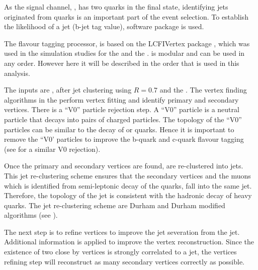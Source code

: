 As the signal channel, \eeToHHbbWWHad,  has two \Pbottom quarks in the final state, identifying jets originated from \Pbottom quarks is an important part of the event selection. To establish the likelihood of a \Pbottom jet (b-jet tag value), \lcfiplus \cite{Suehara:2015ura} software package is used.


The flavour tagging processor, \lcfiplus \cite{Suehara:2015ura} is based on the LCFIVertex package \cite{Bailey:2009ui}, which was used in the simulation studies for the \ILCloi \cite{Abe:2010aa,Aihara:2009ad} and the \CLICcdr \cite{Linssen:2012hp}.  \lcfiplus is modular and can be used in any order. However here it will be described in the order that is used in this analysis.


The inputs are \PFOs, after jet clustering using $R = 0.7$ and the \normalPFO. The vertex finding algorithms in the \lcfiplus perform vertex fitting and identify primary and secondary vertices. There is a ``V0'' particle rejection step.  A ``V0'' particle is a  neutral particle that decays into pairs of charged particles. The topology of the ``V0'' particles can be  similar to the decay of \Pbottom or \Pcharm quarks. Hence it is important to remove the ``V0' particles to improve the b-quark and c-quark flavour tagging (see  for a similar V0 rejection).

Once the primary and secondary vertices are found, \PFOs are re-clustered into jets. This jet re-clustering scheme ensures that the secondary vertices and the muons which is identified from semi-leptonic decay of the quarks, fall into the same jet. Therefore, the topology of the jet is consistent with the  hadronic decay of heavy quarks. The jet re-clustering scheme are Durham and Durham modified algorithms (see ).

The next step is to refine vertices to improve the \Pbottom jet severation from the \Pcharm jet.  Additional information is applied to improve the vertex reconstruction. Since the existence of two close by vertices is strongly correlated to a \Pbottom jet, the vertices refining step will reconstruct as many secondary vertices correctly as possible.

